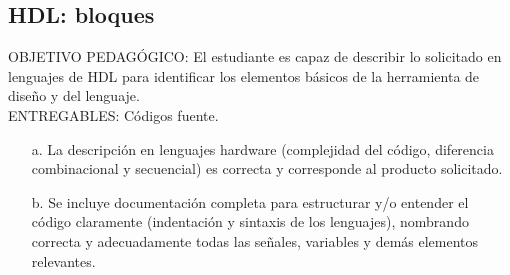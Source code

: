 \subsection{HDL: bloques}
\scriptsize
	\begin{tcolorbox}[enhanced,title=PRODUCTO DE CALIDAD:,colframe=colorA1,colback=colorA2,arc=0mm,colbacktitle=white,fonttitle=\bfseries,coltitle=white,attach boxed title to top left={xshift=3.2mm,yshift=-0.50mm},boxed title style={skin=enhancedfirst jigsaw,size=small,arc=0mm,bottom=1mm,interior style={fill=none,top color=color2,bottom color=color2},,boxrule=0pt},boxrule=0pt]
		OBJETIVO PEDAGÓGICO: El estudiante es capaz de describir lo solicitado en lenguajes de HDL para identificar los elementos básicos de la herramienta de diseño y del lenguaje. \\
		ENTREGABLES: Códigos fuente.
		\begin{enumerate}
			\item[a.] La descripción en lenguajes hardware (complejidad del código, diferencia combinacional y secuencial) es correcta y corresponde al producto solicitado.
			\item[b.] Se incluye documentación completa para estructurar y/o entender el código claramente (indentación y sintaxis de los lenguajes), nombrando correcta y adecuadamente todas las señales, variables y demás elementos relevantes. 
		\end{enumerate}
	\end{tcolorbox}

\normalsize

	
